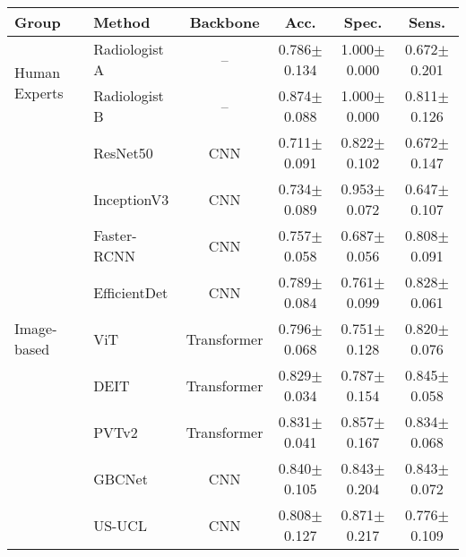 \begin{table}[t]
	\centering
    \footnotesize
	\begin{tabular}{llcccc}
		\toprule
		{\textbf{Group}} & {\textbf{Method}} & {\textbf{Backbone}} & {\textbf{Acc.}} &  {\textbf{Spec.}} & {\textbf{Sens.}} \\
		\midrule
        \multirow{2}{*}{Human Experts} 
		& Radiologist A  & -- & 0.786$\pm$0.134 & 1.000$\pm$0.000 & 0.672$\pm$0.201 \\%
		& Radiologist B  & -- & 0.874$\pm$0.088 & 1.000$\pm$0.000 & 0.811$\pm$0.126 \\%
		\midrule
		\multirow{10}{*}{Image-based} 
		& ResNet50 \cite{resnet} & CNN & 0.711$\pm$0.091 & 0.822$\pm$0.102 & 0.672$\pm$0.147 \\%
		& InceptionV3 \cite{inception} & CNN & 0.734$\pm$0.089 & 0.953$\pm$0.072 & 0.647$\pm$0.107 \\%
        & Faster-RCNN \cite{fasterrcnn} & CNN & 0.757$\pm$0.058 & 0.687$\pm$0.056 & 0.808$\pm$0.091 \\%
		& EfficientDet \cite{efficientdet} & CNN & 0.789$\pm$0.084 & 0.761$\pm$0.099 & 0.828$\pm$0.061 \\%
        \cmidrule{2-6}
        & ViT \cite{vit} & Transformer & 0.796$\pm$0.068 & 0.751$\pm$0.128 & 0.820$\pm$0.076 \\%
		& DEIT \cite{touvron2021training} & Transformer & 0.829$\pm$0.034  & 0.787$\pm$0.154 & 0.845$\pm$0.058 \\%
		& PVTv2 \cite{wang2021pvtv2} & Transformer & 0.831$\pm$0.041 & 0.857$\pm$0.167 & 0.834$\pm$0.068  \\%
        \cmidrule{2-6}
        & GBCNet \cite{basu2022surpassing} & CNN & 0.840$\pm$0.105 & 0.843$\pm$0.204 & 0.843$\pm$0.072 \\%
		& US-UCL \cite{basu2022unsupervised} & CNN & 0.808$\pm$0.127 & 0.871$\pm$0.217 & 0.776$\pm$0.109 \\%

\end{tabular}
\end{table}
